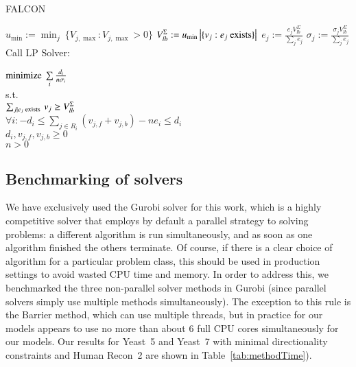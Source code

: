\begin{algorithm}
\caption{FALCON}
\label{alg:FALCON}
\begin{algorithmic}
\State $u_{\min} := \min_j\ \{V_{j,\max} : V_{j,\max} > 0\}$
\State $V_{lb}^{\Sigma} := u_{\min} \left|\{v_j : e_j \textnormal{ exists}\}\right|$
  \State $e_j := \frac{e_j V_{lb}^{\Sigma}}
    {\sum\limits_{j} e_j}$ 
  \State $\sigma_j := \frac{\sigma_j V_{lb}^{\Sigma}}
    {\sum\limits_{j} e_j}$
\EndFor
{}
  \State Call LP Solver:
  \State \hspace{4.8mm} \parbox[t]{\dimexpr\linewidth-\algorithmicindent}{
    $\textnormal{minimize}\ \sum\limits_i \frac{d_i}{n \sigma_i}$\\
    s.t.\\
    $\sum_{j \mid e_j \textnormal{ exists }} v_j \geq V_{lb}^{\Sigma}$\\ 
    $\forall i: -d_i \leq \sum\nolimits_{j \in R_i} (v_{j,f} +
    v_{j,b}) - n e_i \leq d_i$\\ 
    $d_i, v_{j,f}, v_{j,b} \geq 0$\\ 
    $n > 0$
    \strut}
  \EndFor
\EndWhile
\end{algorithmic}
\end{algorithm}


\subsection{Benchmarking of solvers}
We have exclusively used the Gurobi solver \citep{gurobi} for this
work, which is a highly competitive solver that employs by default a
parallel strategy to solving problems: a different algorithm is run
simultaneously, and as soon as one algorithm finished the others
terminate. Of course, if there is a clear choice of algorithm for a
particular problem class, this should be used in production settings
to avoid wasted CPU time and memory. In order to address this, we
benchmarked the three non-parallel solver methods in Gurobi
 (since parallel solvers simply use multiple methods simultaneously).
The exception to this rule is the Barrier method, which can use
multiple threads, but in practice for our models appears to use
no more than about 6 full CPU cores simultaneously for our models.
Our results for Yeast~5 and Yeast~7 with minimal directionality constraints
\citep{Heavner2012,Lee2012,Aung2013} and Human Recon~2 \citep{Thiele2013}
are shown in \suppOrApp Table~\ref{tab:methodTime}).


